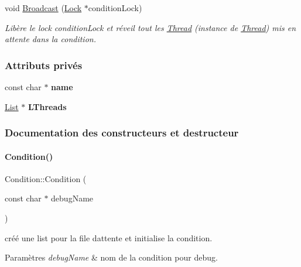 \begin{DoxyCompactItemize}
void \hyperlink{class_condition_aefae94b3f9be40a09df667e63a4bdab7}{Broadcast} (\hyperlink{class_lock}{Lock} $\ast$condition\+Lock)
\begin{DoxyCompactList}\small\item\em Libère le lock condition\+Lock et réveil tout les \hyperlink{class_thread}{Thread} (instance de \hyperlink{class_thread}{Thread}) mis en attente dans la condition. \end{DoxyCompactList}\end{DoxyCompactItemize}
\subsubsection*{Attributs privés}
\begin{DoxyCompactItemize}
\item 
\hypertarget{class_condition_a8938b4b1f026d03713a654857b39e495}{}\label{class_condition_a8938b4b1f026d03713a654857b39e495} 
const char $\ast$ {\bfseries name}
\item 
\hypertarget{class_condition_ae402abf0d4bf9a250c2ca9c73f1aabb3}{}\label{class_condition_ae402abf0d4bf9a250c2ca9c73f1aabb3} 
\hyperlink{class_list}{List} $\ast$ {\bfseries L\+Threads}
\end{DoxyCompactItemize}


\subsubsection{Documentation des constructeurs et destructeur}
\hypertarget{class_condition_a518a2676e2b33b0481f185d0f942c9c1}{}\label{class_condition_a518a2676e2b33b0481f185d0f942c9c1} 
\paragraph{\texorpdfstring{Condition()}{Condition()}}
{\footnotesize\ttfamily Condition\+::\+Condition (\begin{DoxyParamCaption}\item[{const char $\ast$}]{debug\+Name }\end{DoxyParamCaption})}



créé une list pour la file d\textquotesingle{}attente et initialise la condition. 


\begin{DoxyParams}{Paramètres}
{\em debug\+Name} & nom de la condition pour debug. \\
\hline
\end{DoxyParams}


